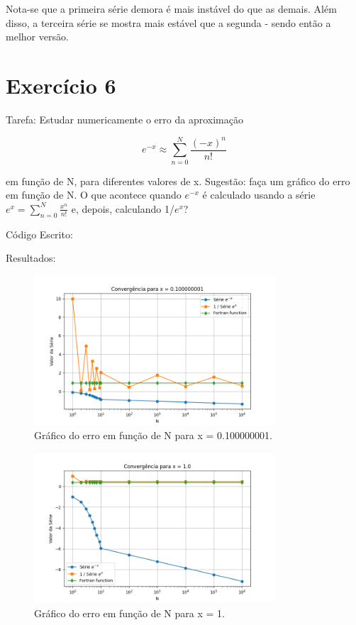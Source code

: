 \documentclass[12pt, a4paper]{article} %
\begin{document}
    Nota-se que a primeira s\'erie demora \'e mais inst\'avel do que as demais. Al\'em disso, a terceira s\'erie se mostra mais est\'avel que a segunda - sendo ent\~ao a melhor vers\~ao.

\section{Exerc\'icio 6}

    Tarefa: Estudar numericamente o erro da aproxima\c{c}\~ao

    \begin{equation} e^{-x} \approx \sum_{n=0}^N \frac{(-x)^n}{n!} \end{equation}

    em fun\c{c}\~ao de N, para diferentes valores de x. Sugest\~ao: fa\c{c}a um gr\'afico do erro em fun\c{c}\~ao de N. O que acontece quando $e^{-x}$  \'e calculado usando a s\'erie $e^x = \sum_{n=0}^{N} \frac{x^n}{n!}$ e, depois, calculando 1/$e^x$?

    C\'odigo Escrito:
    

    Resultados:
    \begin{figure}[H]
        \centering
        \includegraphics[width=0.8\textwidth]{../images/grafico_x_0.100000001.png}
        \caption{Gr\'afico do erro em fun\c{c}\~ao de N para x = 0.100000001.}
    \end{figure}

    \begin{figure}[H]
        \centering
        \includegraphics[width=0.8\textwidth]{../images/grafico_x_1.0.png}
        \caption{Gr\'afico do erro em fun\c{c}\~ao de N para x = 1.}
    \end{figure}
\end{document}
